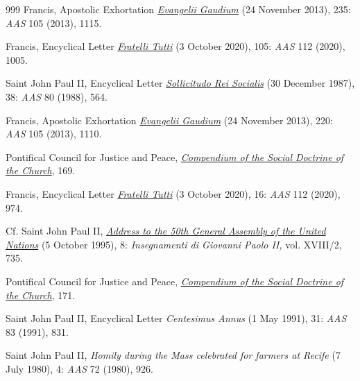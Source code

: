 \documentclass{article}
\begin{document}
\begin{thebibliography}{999}
 Francis, Apostolic Exhortation \href{https://www.vatican.va/content/francesco/en/apost_exhortations/documents/papa-francesco_esortazione-ap_20131124_evangelii-gaudium.html}{\emph{Evangelii Gaudium}} (24 November 2013), 235: \emph{AAS} 105 (2013), 1115.

 Francis, Encyclical Letter \href{https://www.vatican.va/content/francesco/en/encyclicals/documents/papa-francesco_20201003_enciclica-fratelli-tutti.html}{\emph{Fratelli Tutti}} (3 October 2020), 105: \emph{AAS} 112 (2020), 1005.

 Saint John Paul II, Encyclical Letter \href{https://www.vatican.va/content/john-paul-ii/en/encyclicals/documents/hf_jp-ii_enc_30121987_sollicitudo-rei-socialis.html}{\emph{Sollicitudo Rei Socialis}} (30 December 1987), 38: \emph{AAS} 80 (1988), 564.

 Francis, Apostolic Exhortation \href{https://www.vatican.va/content/francesco/en/apost_exhortations/documents/papa-francesco_esortazione-ap_20131124_evangelii-gaudium.html}{\emph{Evangelii Gaudium}} (24 November 2013), 220: \emph{AAS} 105 (2013), 1110.

 Pontifical Council for Justice and Peace, \href{https://www.vatican.va/roman_curia/pontifical_councils/justpeace/documents/rc_pc_justpeace_doc_20060526_compendio-dott-soc_en.html}{\emph{Compendium of the Social Doctrine of the Church}}, 169.

 Francis, Encyclical Letter \href{https://www.vatican.va/content/francesco/en/encyclicals/documents/papa-francesco_20201003_enciclica-fratelli-tutti.html}{\emph{Fratelli Tutti}} (3 October 2020), 16: \emph{AAS} 112 (2020), 974.

 Cf. Saint John Paul II, \href{https://www.vatican.va/content/john-paul-ii/en/speeches/1995/october/documents/hf_jp-ii_spe_05101995_address-to-uno.html}{\emph{Address to the 50th General Assembly of the United Nations}} (5 October 1995), 8: \emph{Insegnamenti di Giovanni Paolo II,} vol. XVIII/2, 735.

 Pontifical Council for Justice and Peace, \href{https://www.vatican.va/roman_curia/pontifical_councils/justpeace/documents/rc_pc_justpeace_doc_20060526_compendio-dott-soc_en.html}{\emph{Compendium of the Social Doctrine of the Church}}, 171.

 Saint John Paul II, Encyclical Letter \emph{Centesimus Annus} (1 May 1991), 31: \emph{AAS} 83 (1991), 831.

 Saint John Paul II, \emph{Homily during the Mass celebrated for farmers at Recife} (7 July 1980), 4: \emph{AAS} 72 (1980), 926.


\end{thebibliography}
\end{document}
